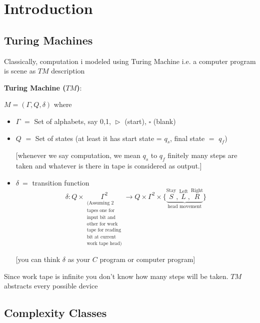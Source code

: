 \chapter{Introduction}
\section{Turing Machines}
Classically, computation i modeled using Turing Machine i.e. a computer program is scene as $TM$ description\parinf
\vspace{0.5cm}

\textbf{Turing Machine ($TM$)}: {$M=(\Gamma, Q,\delta)$ where \begin{itemize}
		\item $\Gamma$ $=$ Set of alphabets, say 0,1, $\vartriangleright$ (start), $\square$ (blank)
		\item $Q$ $=$ Set of states (at least it has start state = $q_s$, final state $=$ $q_f$)
		
		[whenever we say computation, we mean $q_s$ to $q_f$ finitely many steps are taken and whatever is there in tape is considered as output.]
		\item $\delta\ =$ transition function$$\delta : Q\times \underset{\substack{  (\text{Assuming 2}\\ \text{tapes one for} \\ \text{input bit and}\\ \text{other for work}\\ \text{tape for reading}\\ \text{bit at current}\\ \text{work tape head)} }}{\Gamma^2}\longrightarrow Q\times \Gamma^2\times \{\underbrace{\overset{\text{Stay}}{S},\overset{\text{Left}}{L},\overset{\text{Right}}{R}  }_{\text{head movement}} \}$$
		
		[you can think $\delta$ as your $C$ program or computer program]
\end{itemize}
\parinn

Since work tape is infinite you don't know how many steps will be taken. $TM$ abstracts every possible device

\section{Complexity Classes}

}
